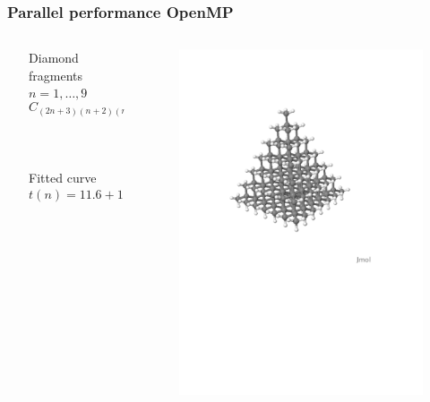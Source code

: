 \documentclass[mathserif, 10pt]{beamer}
\begin{document}
\begin{frame}
    \frametitle{Parallel performance OpenMP}
    \begin{columns}
    \begin{column}{.10\textwidth}
    \ \\
    \end{column}
    \begin{column}{.40\textwidth}
    \center
    Diamond fragments $n=1,\dots,9$
    \begin{equation}
	\nonumber
	C_{(2n+3)(n+2)(n+1)/6}H_{2(n+2)(n+1)}
    \end{equation}
    \ \\
    \ \\
    \ \\
    Fitted curve
    \begin{equation}
	\nonumber
	t(n) = 11.6 + 1.84n^{0.805}
    \end{equation}
    \end{column}
    \begin{column}{.50\textwidth}
	\begin{figure}
	    \includegraphics[scale=0.25, clip, viewport = 10 390 500 720]{figures/diamond.pdf}

\end{figure}
\end{column}
\end{columns}
\end{frame}
\end{document}
